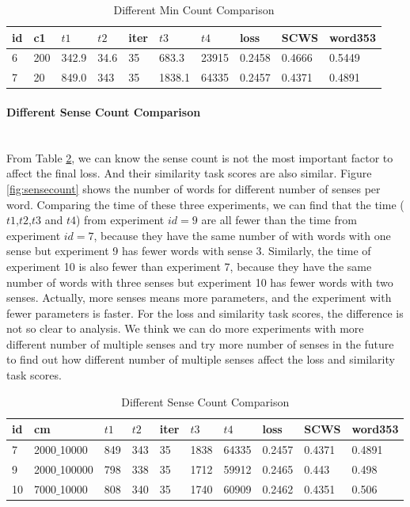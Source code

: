 \begin{table}[tb]
\caption{Different Min Count Comparison} \label{tab:group2} 
\begin{center}
\begin{tabular}{|l|l|l|l|l|l|l|l|l|l|}
\hline
id& c1 & $t1$ & $t2$ & iter & $t3$ & $t4$ & loss & SCWS & word353	   \\ 
\hline
6 	&  200 	& 342.9	& 34.6	& 35	& 683.3 &	23915  & 0.2458 &0.4666 & 0.5449  \\ 
\hline
7	&  20	& 849.0	& 343	& 35	& 1838.1 &	64335  & 0.2457 &0.4371	&0.4891    \\ 
\hline
\end{tabular}
\end{center}
\end{table}

\clearpage %

\paragraph{Different Sense Count Comparison} \ \\
From Table \ref{tab:group3}, we can know the sense count is not the most important factor to affect the final loss. And their similarity task scores are also similar. Figure \ref{fig:sensecount} shows the number of words for different number of senses per word.  Comparing the time of these three experiments, we can find that the time ($t1$,$t2$,$t3$ and $t4$) from experiment $id=9$ are all fewer than the time from experiment $id=7$, because they have the same number of with words with one sense but experiment 9 has fewer words with sense 3. Similarly, the time of experiment 10 is also fewer than experiment 7, because they have the same number of words with three senses but experiment 10 has fewer words with two senses. Actually, more senses means more parameters, and the experiment with fewer parameters is faster. For the loss and similarity task scores, the difference is not so clear to analysis. We think we can do more experiments with more different number of multiple senses and try more number of senses in the future to find out how different number of multiple senses affect the loss and similarity task scores.

\begin{table}[tb]
\caption{Different Sense Count Comparison} \label{tab:group3} 
\begin{center}
\begin{tabular}{|l|l|l|l|l|l|l|l|l|l|}
\hline
id& cm & $t1$ & $t2$ & iter & $t3$ & $t4$ &    loss  & 	SCWS & 	word353	   \\ 

\hline
7	& 2000$\_$10000	& 849	& 343	& 35	& 1838 &	64335  & 0.2457 &0.4371	&0.4891	  \\ 
\hline
9 	& 2000$\_$100000 	& 798	& 338	& 35	& 1712 &	59912  & 0.2465 &0.443 & 0.498  \\ 
\hline
10 	& 7000$\_$10000 	& 808	& 340	& 35	& 1740  &	60909  & 0.2462 &0.4351 & 0.506  \\ 
\hline
\end{tabular}
\end{center}
\end{table}


